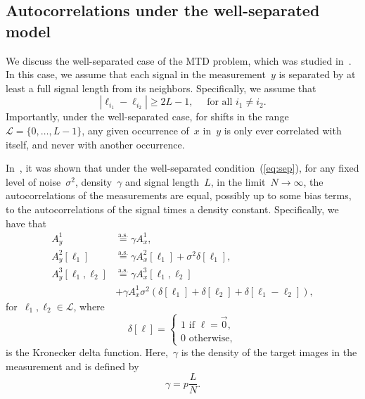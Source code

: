 \documentclass{article}
\begin{document}
\subsection{Autocorrelations under the well-separated model}
\label{subsec:relations}
We discuss the \mbox{well-separated} case of the MTD problem, which was studied in~\cite{bendory2019multi}. In this case, we assume that each signal in the measurement~$y$ is separated by at least a full signal length from its neighbors. Specifically, we assume that
\begin{equation}
\label{eq:sep}
|\ell_{i_1} - \ell_{i_2}| \ge 2L - 1, \quad \text{ for all } i_1 \ne i_2.
\end{equation}
Importantly, under the well-separated case, for shifts in the range \mbox{$\mathcal{L} = \{0, \ldots, {L - 1}\}$}, any given occurrence of~$x$ in~$y$ is only ever correlated with itself, and never with another occurrence.

In~\cite{bendory2019multi}, it was shown that under the well-separated condition~(\ref{eq:sep}), for any fixed level of noise~$\sigma^2$, density~$\gamma$ and signal length~$L$, in the limit~\mbox{$N \rightarrow \infty$}, the autocorrelations of the measurements are equal, possibly up to some bias terms, to the autocorrelations of the signal times a density constant. Specifically, we have that
\begin{align}
A_{y}^1 &\stackrel{\text{a.s.}}{=} \gamma A_{x}^1, \\
A_{y}^2 [\ell_1] &\stackrel{\text{a.s.}}{=} \gamma A_{x}^2 [\ell_1] + \sigma^2\delta[\ell_1], \\
A_{y}^3 [\ell_1, \ell_2] &\stackrel{\text{a.s.}}{=} \gamma A_{x}^3 [\ell_1, \ell_2] \nonumber \\&+ \gamma A_{x}^1 \sigma^2 (\delta[\ell_1] + \delta[\ell_2] + \delta[\ell_1 - \ell_2]),
\end{align}
for~$\ell_1, \ell_2 \in \mathcal{L}$, where
\begin{equation*}
\delta[\ell] = \begin{cases} 1 \text{ if } \ell = \vec{0}, \\ 0 \text{ otherwise}, \end{cases}
\end{equation*}
is the Kronecker delta function. Here,~$\gamma$ is the density of the target images in the measurement and is defined by
\begin{equation*}
\gamma = p \frac{L}{N}.
\end{equation*}
\end{document}
